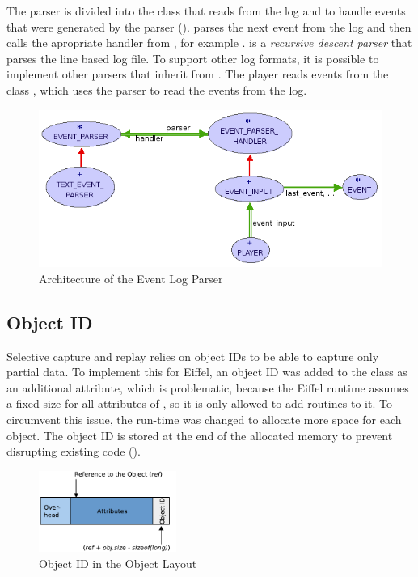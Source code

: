 The parser is divided into the class  that reads from the log and  to handle events that were generated by the parser ().  parses the next event from the log and then calls the apropriate handler from , for example .  
 is a \emph{recursive descent parser} \cite{aho86} that parses the line based log file. To support other log formats, it is possible to implement other parsers that inherit from .
The player reads events from the class , which uses the parser to read the events from the log.

\begin{figure}[ht]
  \centering
  \includegraphics[width=1\textwidth]{illustrations/implementation_parser.png}
  \caption{Architecture of the Event Log Parser}
  \label{fig:implementation_parser}
\end{figure}


\subsection{Object ID}
Selective capture and replay relies on object IDs to be able to capture only partial data. To implement this for Eiffel, an object ID was added to the class  as an additional attribute, which is problematic, because the Eiffel runtime assumes a fixed size for all attributes of , so it is only allowed to add routines to it. To circumvent this issue, the run-time was  changed to allocate more space for each object. The object ID is stored at the end of the allocated memory to prevent disrupting existing code ().
\begin{figure}[ht]
  \centering
  \includegraphics[width=0.4\textwidth]{illustrations/any_object_id}
  \caption{Object ID in the Object Layout}
  \label{fig:any_object_id}
\end{figure}

